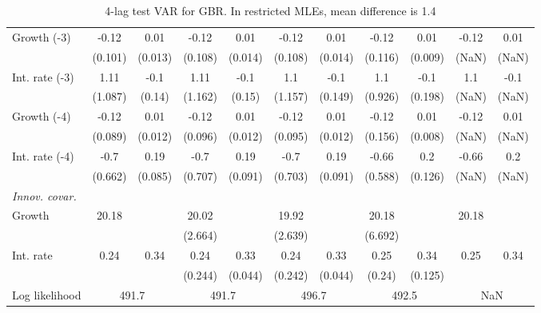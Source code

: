 \begin{table}[htbp]
\begin{tabular}{@{\extracolsep{4pt}}lcccccccccc@{}}
\quad Growth (-3) 	 &-0.12 	 & 0.01 	 & -0.12 	 & 0.01 	 & -0.12 	 & 0.01 	 & -0.12 	 & 0.01 	 & -0.12 	 & 0.01	 \\ 
 		 & (0.101) 	 & (0.013) 	 & (0.108) 	 & (0.014) 	 & (0.108) 	 & (0.014) 	 & (0.116) 	 & (0.009) 	 & (NaN) 	 & (NaN) 	 \\ 
\quad Int. rate (-3) 	 &1.11 	 & -0.1 	 & 1.11 	 & -0.1 	 & 1.1 	 & -0.1 	 & 1.1 	 & -0.1 	 & 1.1 	 & -0.1	 \\ 
 		 & (1.087) 	 & (0.14) 	 & (1.162) 	 & (0.15) 	 & (1.157) 	 & (0.149) 	 & (0.926) 	 & (0.198) 	 & (NaN) 	 & (NaN) 	 \\ 
\quad Growth (-4) 	 &-0.12 	 & 0.01 	 & -0.12 	 & 0.01 	 & -0.12 	 & 0.01 	 & -0.12 	 & 0.01 	 & -0.12 	 & 0.01	 \\ 
 		 & (0.089) 	 & (0.012) 	 & (0.096) 	 & (0.012) 	 & (0.095) 	 & (0.012) 	 & (0.156) 	 & (0.008) 	 & (NaN) 	 & (NaN) 	 \\ 
\quad Int. rate (-4) 	 &-0.7 	 & 0.19 	 & -0.7 	 & 0.19 	 & -0.7 	 & 0.19 	 & -0.66 	 & 0.2 	 & -0.66 	 & 0.2	 \\ 
 		 & (0.662) 	 & (0.085) 	 & (0.707) 	 & (0.091) 	 & (0.703) 	 & (0.091) 	 & (0.588) 	 & (0.126) 	 & (NaN) 	 & (NaN) 	 \\ 
\rule{0pt}{4ex} \emph{Innov. covar.}  	 & 	 & 	 & 	 & 	 & 	 & 	 & 	 & 	 & 	 &\\ 
\quad Growth 	 &20.18 	 &  	 & 20.02 	 &  	 & 19.92 	 &  	 & 20.18 	 &  	 & 20.18 	 & 	 \\ 
 		 &  	 &  	 & (2.664) 	 &  	 & (2.639) 	 &  	 & (6.692) 	 &  	 &  	 &  	 \\ 
\quad Int. rate 	 &0.24 	 & 0.34 	 & 0.24 	 & 0.33 	 & 0.24 	 & 0.33 	 & 0.25 	 & 0.34 	 & 0.25 	 & 0.34	 \\ 
 		 &  	 &  	 & (0.244) 	 & (0.044) 	 & (0.242) 	 & (0.044) 	 & (0.24) 	 & (0.125) 	 &  	 &  	 \\ 
 \hline \rule{0pt}{4ex} 
  Log likelihood 	 &\multicolumn{2}{c}{491.7} 	 & \multicolumn{2}{c}{491.7} 	 & \multicolumn{2}{c}{496.7} 	 & \multicolumn{2}{c}{492.5} 	 & \multicolumn{2}{c}{NaN}\\ 

 \hline 	\end{tabular}		\caption{4-lag test VAR for GBR. In restricted MLEs, mean difference is 1.4}
		\label{tab:GBR4}

\end{table}